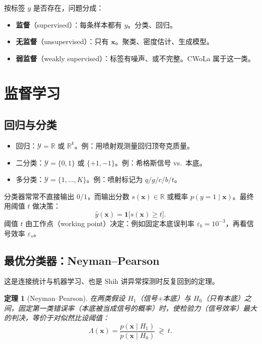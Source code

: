 \documentclass[11pt,a4paper]{article}
\theoremstyle{definition}
\theoremstyle{plain}
\newtheorem{theorem}{定理}[section]
\theoremstyle{remark}
\newcommand{\R}{\mathbb{R}}
\newcommand{\ind}{\mathbf{1}}
\begin{document}
按标签 $y$ 是否存在，问题分成：
\begin{itemize}[leftmargin=1.4em]
  \item \textbf{监督}（supervised）：每条样本都有 $y$。分类、回归。
  \item \textbf{无监督}（unsupervised）：只有 $\mathbf{x}$。聚类、密度估计、生成模型。
  \item \textbf{弱监督}（weakly supervised）：标签有噪声、或不完整。CWoLa 属于这一类。
\end{itemize}

\section{监督学习}
\label{sec:supervised}

\subsection{回归与分类}

\begin{itemize}[leftmargin=1.4em]
  \item 回归：$\mathcal{Y}=\R$ 或 $\R^{k}$。例：用喷射观测量回归顶夸克质量。
  \item 二分类：$\mathcal{Y}=\{0,1\}$ 或 $\{+1,-1\}$。例：希格斯信号 vs.\ 本底。
  \item 多分类：$\mathcal{Y}=\{1,\ldots,K\}$。例：喷射标记为 $q/g/c/b/t$。
\end{itemize}

分类器常常不直接输出 $0/1$，而输出分数 $s(\mathbf{x})\in\R$ 或概率 $p(y=1\mid\mathbf{x})$。最终用阈值 $t$ 做决策：
\begin{equation}
  \hat y(\mathbf{x})=\ind\bigl[s(\mathbf{x})\ge t\bigr].
\end{equation}
阈值 $t$ 由工作点（working point）决定：例如固定本底误判率 $\varepsilon_b=10^{-3}$，再看信号效率 $\varepsilon_s$。

\subsection{最优分类器：Neyman--Pearson}

这是连接统计与机器学习、也是 Shih 讲异常探测时反复回到的定理。

\begin{theorem}[Neyman--Pearson]
在两类假设 $H_1$（信号+本底）与 $H_0$（只有本底）之间，固定第一类错误率（本底被当成信号的概率）时，使检验力（信号效率）最大的判决，等价于对似然比设阈值：
\begin{equation}
  \Lambda(\mathbf{x})=\frac{p(\mathbf{x}\mid H_1)}{p(\mathbf{x}\mid H_0)}\ \gtrless\ t.
\end{equation}
\end{theorem}
\end{document}
